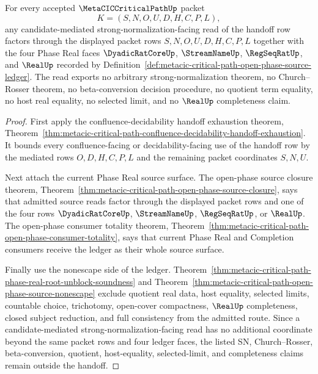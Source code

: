 \begin{theorem}
\label{thm:metacic-critical-path-candidate-mediated-sn-boundary}
For every accepted $\MetaCICCriticalPathUp$ packet
$$
K=(S,N,O,U,D,H,C,P,L),
$$
any candidate-mediated strong-normalization-facing read of the handoff row factors through the displayed packet rows $S,N,O,U,D,H,C,P,L$ together with the four Phase Real faces $\DyadicRatCoreUp$, $\StreamNameUp$, $\RegSeqRatUp$, and $\RealUp$ recorded by Definition~\ref{def:metacic-critical-path-open-phase-source-ledger}. The read exports no arbitrary strong-normalization theorem, no Church--Rosser theorem, no beta-conversion decision procedure, no quotient term equality, no host real equality, no selected limit, and no $\RealUp$ completeness claim.
\end{theorem}
\begin{proof}
First apply the confluence-decidability handoff exhaustion theorem, Theorem~\ref{thm:metacic-critical-path-confluence-decidability-handoff-exhaustion}. It bounds every confluence-facing or decidability-facing use of the handoff row by the mediated rows $O,D,H,C,P,L$ and the remaining packet coordinates $S,N,U$.

Next attach the current Phase Real source surface. The open-phase source closure theorem, Theorem~\ref{thm:metacic-critical-path-open-phase-source-closure}, says that admitted source reads factor through the displayed packet rows and one of the four rows $\DyadicRatCoreUp$, $\StreamNameUp$, $\RegSeqRatUp$, or $\RealUp$. The open-phase consumer totality theorem, Theorem~\ref{thm:metacic-critical-path-open-phase-consumer-totality}, says that current Phase Real and Completion consumers receive the ledger as their whole source surface.

Finally use the nonescape side of the ledger. Theorem~\ref{thm:metacic-critical-path-phase-real-root-unblock-soundness} and Theorem~\ref{thm:metacic-critical-path-open-phase-source-nonescape} exclude quotient real data, host equality, selected limits, countable choice, trichotomy, open-cover compactness, $\RealUp$ completeness, closed subject reduction, and full consistency from the admitted route. Since a candidate-mediated strong-normalization-facing read has no additional coordinate beyond the same packet rows and four ledger faces, the listed SN, Church--Rosser, beta-conversion, quotient, host-equality, selected-limit, and completeness claims remain outside the handoff.
\end{proof}

